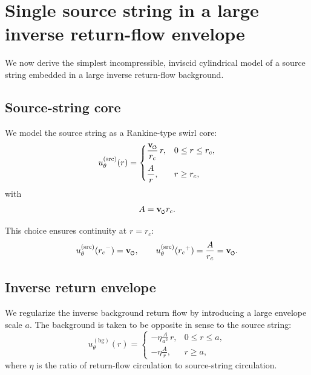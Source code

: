 \documentclass[11pt]{article}
\newcommand{\swirlarrow}{\mathchoice{\mkern-2mu\scriptstyle\boldsymbol{\circlearrowleft}}{\mkern-2mu\scriptstyle\boldsymbol{\circlearrowleft}}{\mkern-2mu\scriptscriptstyle\boldsymbol{\circlearrowleft}}{\mkern-2mu\scriptscriptstyle\boldsymbol{\circlearrowleft}}}
\newcommand{\vswirl}{\mathbf{v}_{\swirlarrow}}
\newcommand{\rc}{{r_c}}
\newcommand{\src}{\mathrm{src}}
\newcommand{\bg}{\mathrm{bg}}
\begin{document}
        \section{Single source string in a large inverse return-flow envelope}
        
        We now derive the simplest incompressible, inviscid cylindrical model of a source string embedded in a large inverse return-flow background.
        
        \subsection{Source-string core}
            
            We model the source string as a Rankine-type swirl core:
            \begin{equation}
                u_\theta^{(\src)}(r)
                =
                \begin{cases}
                    \displaystyle \frac{\vswirl}{\rc}\,r, & 0\le r\le \rc, \\[1em]
                    \displaystyle \frac{A}{r}, & r\ge \rc,
                \end{cases}
                \label{eq:u-src}
            \end{equation}
            with
            \[
                A=\vswirl \rc.
            \]
            
            This choice ensures continuity at \(r=\rc\):
            \[
                u_\theta^{(\src)}(\rc^-)=\vswirl,
                \qquad
                u_\theta^{(\src)}(\rc^+)=\frac{A}{\rc}=\vswirl.
            \]
        
        \subsection{Inverse return envelope}
            
            We regularize the inverse background return flow by introducing a large envelope scale \(a\). The background is taken to be opposite in sense to the source string:
            \begin{equation}
                u_\theta^{(\bg)}(r)
                =
                \begin{cases}
                    \displaystyle -\eta \frac{A}{a^2}\,r, & 0\le r\le a, \\[1em]
                    \displaystyle -\eta \frac{A}{r}, & r\ge a,
                \end{cases}
                \label{eq:u-bg}
            \end{equation}
            where \(\eta\) is the ratio of return-flow circulation to source-string circulation.
            
\end{document}
